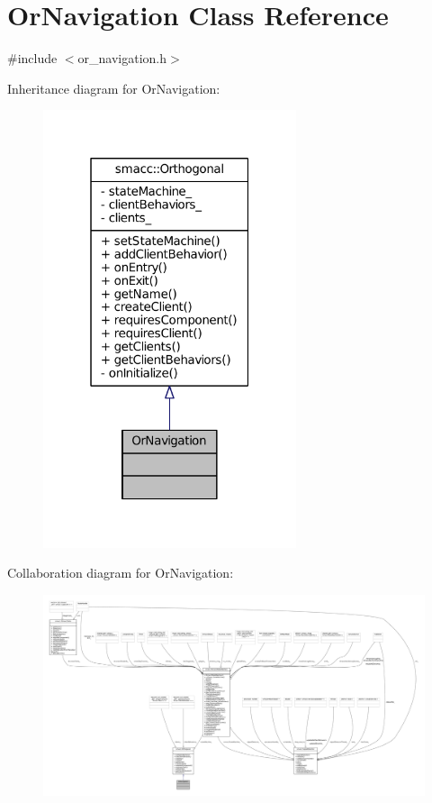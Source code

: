 \hypertarget{classOrNavigation}{}\section{Or\+Navigation Class Reference}
\label{classOrNavigation}


{\ttfamily \#include $<$or\+\_\+navigation.\+h$>$}



Inheritance diagram for Or\+Navigation\+:
\nopagebreak
\begin{figure}[H]
\begin{center}
\leavevmode
\includegraphics[width=211pt]{classOrNavigation__inherit__graph}
\end{center}
\end{figure}


Collaboration diagram for Or\+Navigation\+:
\nopagebreak
\begin{figure}[H]
\begin{center}
\leavevmode
\includegraphics[width=350pt]{classOrNavigation__coll__graph}
\end{center}
\end{figure}
